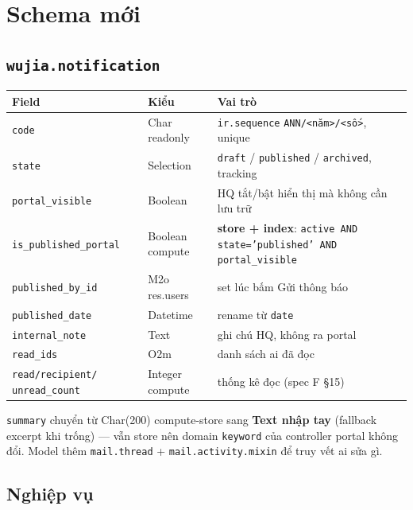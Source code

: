\section{Schema mới}

\subsection{\texttt{wujia.notification}}

\begin{center}
\begin{tabular}{p{3.6cm}p{3.2cm}p{6.9cm}}
\hline
\textbf{Field} & \textbf{Kiểu} & \textbf{Vai trò} \\
\hline
\texttt{code} & Char readonly & \texttt{ir.sequence} \texttt{ANN/<năm>/<số>}, unique \\
\texttt{state} & Selection & \texttt{draft} / \texttt{published} / \texttt{archived}, tracking \\
\texttt{portal\_visible} & Boolean & HQ tắt/bật hiển thị mà không cần lưu trữ \\
\texttt{is\_published\_portal} & Boolean compute & \textbf{store + index}: \texttt{active AND
state='published' AND portal\_visible} \\
\texttt{published\_by\_id} & M2o res.users & set lúc bấm Gửi thông báo \\
\texttt{published\_date} & Datetime & rename từ \texttt{date} \\
\texttt{internal\_note} & Text & ghi chú HQ, không ra portal \\
\texttt{read\_ids} & O2m & danh sách ai đã đọc \\
\texttt{read/recipient/} \texttt{unread\_count} & Integer compute & thống kê đọc (spec F §15) \\
\hline
\end{tabular}
\end{center}

\texttt{summary} chuyển từ Char(200) compute-store sang \textbf{Text nhập tay} (fallback excerpt
khi trống) --- vẫn store nên domain \texttt{keyword} của controller portal không đổi.
Model thêm \texttt{mail.thread} + \texttt{mail.activity.mixin} để truy vết ai sửa gì.

\subsection{Nghiệp vụ}

